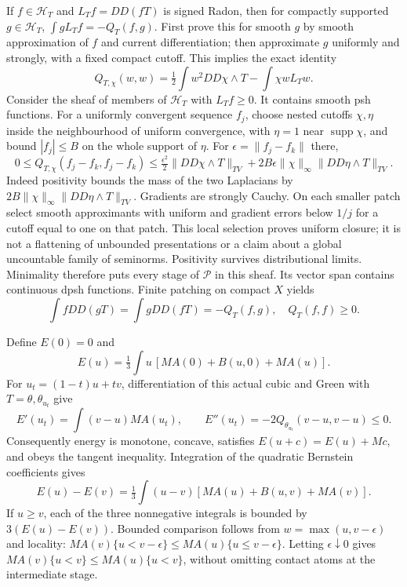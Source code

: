 \documentclass[11pt]{article}
\begin{document}
If $f\in\mathscr H_T$ and $L_Tf=DD(fT)$ is signed Radon, then for compactly supported $g\in\mathscr H_T$, $\int gL_Tf=-Q_T(f,g)$. First prove this for smooth $g$ by smooth approximation of $f$ and current differentiation; then approximate $g$ uniformly and strongly, with a fixed compact cutoff. This implies the exact identity
\[
 Q_{T,\chi}(w,w)=\tfrac12\int w^2DD\chi\wedge T-\int\chi wL_Tw.
\]
Consider the sheaf of members of $\mathscr H_T$ with $L_Tf\ge0$. It contains smooth psh functions. For a uniformly convergent sequence $f_j$, choose nested cutoffs $\chi,\eta$ inside the neighbourhood of uniform convergence, with $\eta=1$ near $\operatorname{supp}\chi$, and bound $|f_j|\le B$ on the whole support of $\eta$. For $\epsilon=\|f_j-f_k\|$ there,
\[
 0\le Q_{T,\chi}(f_j-f_k,f_j-f_k)
 \le\tfrac{\epsilon^2}{2}\|DD\chi\wedge T\|_{TV}
 +2B\epsilon\|\chi\|_\infty\|DD\eta\wedge T\|_{TV}.
\]
Indeed positivity bounds the mass of the two Laplacians by $2B\|\chi\|_\infty\|DD\eta\wedge T\|_{TV}$. Gradients are strongly Cauchy. On each smaller patch select smooth approximants with uniform and gradient errors below $1/j$ for a cutoff equal to one on that patch. This local selection proves uniform closure; it is not a flattening of unbounded presentations or a claim about a global uncountable family of seminorms. Positivity survives distributional limits. Minimality therefore puts every stage of $\mathscr P$ in this sheaf. Its vector span contains continuous dpsh functions. Finite patching on compact $X$ yields
\[
 \int fDD(gT)=\int gDD(fT)=-Q_T(f,g),\quad Q_T(f,f)\ge0.
\]

Define $E(0)=0$ and
\[
 E(u)=\tfrac13\int u\,[MA(0)+B(u,0)+MA(u)].
\]
For $u_t=(1-t)u+tv$, differentiation of this actual cubic and Green with $T=\theta,\theta_{u_t}$ give
\[
 E'(u_t)=\int(v-u)MA(u_t),\qquad E''(u_t)=-2Q_{\theta_{u_t}}(v-u,v-u)\le0.
\]
Consequently energy is monotone, concave, satisfies $E(u+c)=E(u)+Mc$, and obeys the tangent inequality. Integration of the quadratic Bernstein coefficients gives
\[
 E(u)-E(v)=\tfrac13\int(u-v)[MA(u)+B(u,v)+MA(v)].
\]
If $u\ge v$, each of the three nonnegative integrals is bounded by $3(E(u)-E(v))$. Bounded comparison follows from $w=\max(u,v-\epsilon)$ and locality: $MA(v)\{u<v-\epsilon\}\le MA(u)\{u\le v-\epsilon\}$. Letting $\epsilon\downarrow0$ gives $MA(v)\{u<v\}\le MA(u)\{u<v\}$, without omitting contact atoms at the intermediate stage.
\end{document}
